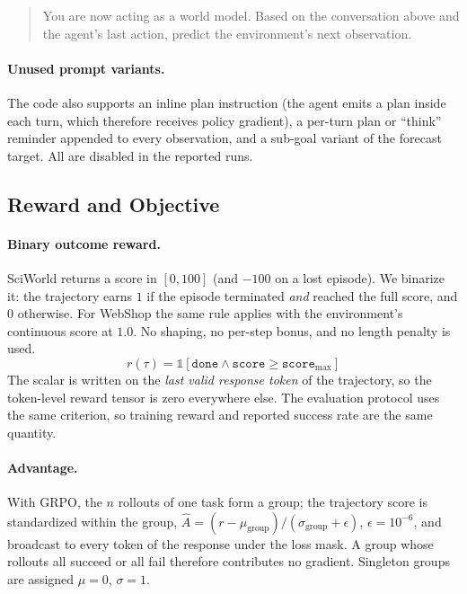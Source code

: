 \begin{quote}\small\ttfamily
You are now acting as a world model. Based on the conversation above and the agent's last
action, predict the environment's next observation.
\end{quote}

\paragraph{Unused prompt variants.}
The code also supports an inline plan instruction (the agent emits a plan inside each
turn, which therefore receives policy gradient), a per-turn plan or ``think'' reminder
appended to every observation, and a sub-goal variant of the forecast target. All are
disabled in the reported runs.

\subsection{Reward and Objective}
\label{app:reward}

\paragraph{Binary outcome reward.}
SciWorld returns a score in $[0, 100]$ (and $-100$ on a lost episode). We binarize it:
the trajectory earns $1$ if the episode terminated \emph{and} reached the full score, and
$0$ otherwise. For WebShop the same rule applies with the environment's continuous score
at $1.0$. No shaping, no per-step bonus, and no length penalty is used.
\[
r(\tau) = \mathbb{1}\left[\texttt{done} \wedge \texttt{score} \ge \texttt{score}_{\max}\right]
\]
The scalar is written on the \emph{last valid response token} of the trajectory, so the
token-level reward tensor is zero everywhere else. The evaluation protocol uses the same
criterion, so training reward and reported success rate are the same quantity.

\paragraph{Advantage.}
With GRPO, the $n$ rollouts of one task form a group; the trajectory score is
standardized within the group, $\hat{A} = (r - \mu_{\text{group}}) /
(\sigma_{\text{group}} + \epsilon)$, $\epsilon = 10^{-6}$, and broadcast to every token
of the response under the loss mask. A group whose rollouts all succeed or all fail
therefore contributes no gradient. Singleton groups are assigned $\mu = 0$, $\sigma = 1$.

